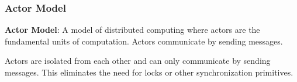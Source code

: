 \subsubsection{Actor Model}

\begin{definition}
\textbf{Actor Model}: A model of distributed computing where actors are the fundamental units of computation. Actors communicate by sending messages.
\end{definition}

\begin{remark}
Actors are isolated from each other and can only communicate by sending messages. This eliminates the need for locks or other synchronization primitives.
\end{remark}
